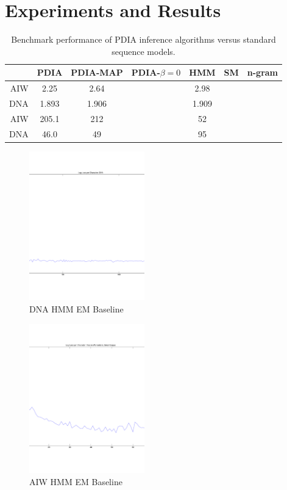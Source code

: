 \section{Experiments and Results}


\begin{table}[t]
    \begin{center}
    \setlength{\tabcolsep}{1.3mm}
\begin{tabular}{r|cccccc}
\hline
& {\bf PDIA } & PDIA-MAP & PDIA-$\beta=0$ & HMM & SM & n-gram \\
\hline
AIW & 2.25 & 2.64 && 2.98 &&\\
DNA & 1.893 & 1.906 & & 1.909 && \\
\hline
\hline
AIW & 205.1 & 212 &  & 52 &&\\
DNA & 46.0 & 49 &  & 95 && \\
\hline
\end{tabular}
\end{center}
\caption[Short]{Benchmark performance of PDIA inference algorithms versus standard sequence models.}
\label{table:results}
\end{table}

\begin{figure}[htbp]
\begin{center}
\includegraphics[width=5cm]{results/dna_hmm_baseline}
\caption{DNA HMM EM Baseline}
\label{fig:dna_hmm_baseline}
\end{center}
\end{figure}


\begin{figure}[htbp]
\begin{center}
\includegraphics[width=5cm]{results/aiw_small_hmm_baseline}
\caption{AIW HMM EM Baseline}
\label{fig:aiw_hmm_baseline}
\end{center}
\end{figure}

